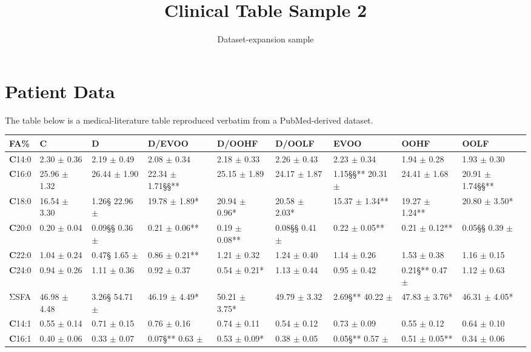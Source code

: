 \documentclass[11pt]{article}
\title{Clinical Table Sample 2}
\author{Dataset-expansion sample}
\date{}
\begin{document}
\maketitle
\section{Patient Data}
The table below is a medical-literature table reproduced verbatim from a PubMed-derived dataset.

\begin{table}
\begin{tabular}{|l|l|l|l|l|l|l|l|l|}
\hline
\textbf{FA\%} & \textbf{C} & \textbf{D} & \textbf{D}/\textbf{EVOO} & \textbf{D}/\textbf{OOHF} & \textbf{D}/\textbf{OOLF} & \textbf{EVOO} & \textbf{OOHF} & \textbf{OOLF} \\
\hline
\textbf{C}14:0 & 2.30 $\pm$ 0.36 & 2.19 $\pm$ 0.49 & 2.08 $\pm$ 0.34 & 2.18 $\pm$ 0.33 & 2.26 $\pm$ 0.43 & 2.23 $\pm$ 0.34 & 1.94 $\pm$ 0.28 & 1.93 $\pm$ 0.30 \\
\hline
\textbf{C}16:0 & 25.96 $\pm$ 1.32 & 26.44 $\pm$ 1.90 & 22.34 $\pm$ 1.71§§** & 25.15 $\pm$ 1.89 & 24.17 $\pm$ 1.87 & 1.15§§** 20.31 $\pm$ & 24.41 $\pm$ 1.68 & 20.91 $\pm$ 1.74§§** \\
\hline
\textbf{C}18:0 & 16.54 $\pm$ 3.30 & 1.26§ 22.96 $\pm$ & 19.78 $\pm$ 1.89* & 20.94 $\pm$ 0.96* & 20.58 $\pm$ 2.03* & 15.37 $\pm$ 1.34** & 19.27 $\pm$ 1.24** & 20.80 $\pm$ 3.50* \\
\hline
\textbf{C}20:0 & 0.20 $\pm$ 0.04 & 0.09§§ 0.36 $\pm$ & 0.21 $\pm$ 0.06** & 0.19 $\pm$ 0.08** & 0.08§§ 0.41 $\pm$ & 0.22 $\pm$ 0.05** & 0.21 $\pm$ 0.12** & 0.05§§ 0.39 $\pm$ \\
\hline
\textbf{C}22:0 & 1.04 $\pm$ 0.24 & 0.47§ 1.65 $\pm$ & 0.86 $\pm$ 0.21** & 1.21 $\pm$ 0.32 & 1.24 $\pm$ 0.40 & 1.14 $\pm$ 0.26 & 1.53 $\pm$ 0.38 & 1.16 $\pm$ 0.15 \\
\hline
\textbf{C}24:0 & 0.94 $\pm$ 0.26 & 1.11 $\pm$ 0.36 & 0.92 $\pm$ 0.37 & 0.54 $\pm$ 0.21* & 1.13 $\pm$ 0.44 & 0.95 $\pm$ 0.42 & 0.21§** 0.47 $\pm$ & 1.12 $\pm$ 0.63 \\
\hline
ΣSFA & 46.98 $\pm$ 4.48 & 3.26§ 54.71 $\pm$ & 46.19 $\pm$ 4.49* & 50.21 $\pm$ 3.75* & 49.79 $\pm$ 3.32 & 2.69§** 40.22 $\pm$ & 47.83 $\pm$ 3.76* & 46.31 $\pm$ 4.05* \\
\hline
\textbf{C}14:1 & 0.55 $\pm$ 0.14 & 0.71 $\pm$ 0.15 & 0.76 $\pm$ 0.16 & 0.74 $\pm$ 0.11 & 0.54 $\pm$ 0.12 & 0.73 $\pm$ 0.09 & 0.55 $\pm$ 0.12 & 0.64 $\pm$ 0.10 \\
\hline
\textbf{C}16:1 & 0.40 $\pm$ 0.06 & 0.33 $\pm$ 0.07 & 0.07§** 0.63 $\pm$ & 0.53 $\pm$ 0.09* & 0.38 $\pm$ 0.05 & 0.05§** 0.57 $\pm$ & 0.51 $\pm$ 0.05** & 0.34 $\pm$ 0.06 \\

\end{tabular}
\end{table}
\end{document}

